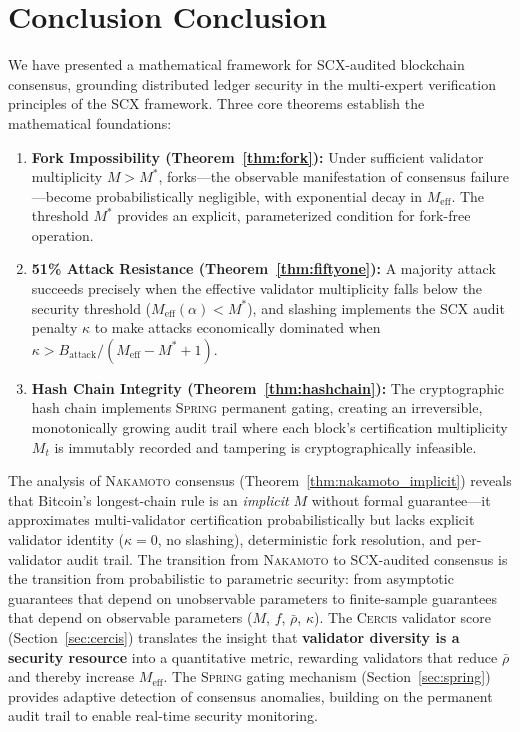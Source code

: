\documentclass[11pt,a4paper]{article}
\theoremstyle{definition}
\newcommand{\Spring}{\textsc{Spring}}
\newcommand{\Cercis}{\textsc{Cercis}}
\newcommand{\SCX}{\textsc{SCX}}
\newcommand{\mthreshold}{M^{*}}
\newcommand{\Nakamoto}{\textsc{Nakamoto}}
\newcommand{\PoS}{\mathrm{PoS}}
\begin{document}
\section{Conclusion Conclusion}
\label{sec:conclusion}
We have presented a mathematical framework for \SCX{}-audited blockchain consensus, grounding distributed ledger security in the multi-expert verification principles of the \SCX{} framework. Three core theorems establish the mathematical foundations:
\begin{enumerate}[label=(\textbf{\arabic*})]
    \item \textbf{Fork Impossibility (Theorem~\ref{thm:fork}):} Under sufficient validator multiplicity $M > \mthreshold$, forks—the observable manifestation of consensus failure—become probabilistically negligible, with exponential decay in $M_{\mathrm{eff}}$. The threshold $\mthreshold$ provides an explicit, parameterized condition for fork-free operation.
    \item \textbf{51\% Attack Resistance (Theorem~\ref{thm:fiftyone}):} A majority attack succeeds precisely when the effective validator multiplicity falls below the security threshold ($M_{\mathrm{eff}}(\alpha) < \mthreshold$), and \PoS{} slashing implements the \SCX{} audit penalty $\kappa$ to make attacks economically dominated when $\kappa > B_{\mathrm{attack}} / (M_{\mathrm{eff}} - \mthreshold + 1)$.
    \item \textbf{Hash Chain Integrity (Theorem~\ref{thm:hashchain}):} The cryptographic hash chain implements \Spring{} permanent gating, creating an irreversible, monotonically growing audit trail where each block's certification multiplicity $M_t$ is immutably recorded and tampering is cryptographically infeasible.
\end{enumerate}
The analysis of \Nakamoto{} consensus (Theorem~\ref{thm:nakamoto_implicit}) reveals that Bitcoin's longest-chain rule is an \textit{implicit} $M$ without formal guarantee—it approximates multi-validator certification probabilistically but lacks explicit validator identity ($\kappa = 0$, no slashing), deterministic fork resolution, and per-validator audit trail. The transition from \Nakamoto{} to \SCX{}-audited consensus is the transition from probabilistic to parametric security: from asymptotic guarantees that depend on unobservable parameters to finite-sample guarantees that depend on observable parameters ($M$, $f$, $\bar{\rho}$, $\kappa$).
The \Cercis{} validator score (Section~\ref{sec:cercis}) translates the insight that \textbf{validator diversity is a security resource} into a quantitative metric, rewarding validators that reduce $\bar{\rho}$ and thereby increase $M_{\mathrm{eff}}$. The \Spring{} gating mechanism (Section~\ref{sec:spring}) provides adaptive detection of consensus anomalies, building on the permanent audit trail to enable real-time security monitoring.
\end{document}
